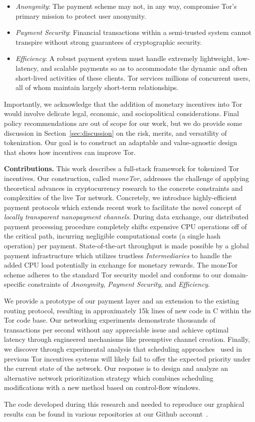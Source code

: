 \begin{itemize}
\item \emph{Anonymity}: The payment scheme may not, in any way, compromise Tor's primary mission to protect user anonymity.
\item \emph{Payment Security}: Financial transactions within a semi-trusted system cannot transpire without strong guarantees of cryptographic security.
\item \emph{Efficiency}: A robust payment system must handle extremely lightweight, low-latency, and scalable payments so as to accommodate the dynamic and often short-lived activities of these clients.
Tor services millions of concurrent users, all of whom maintain largely short-term relationships.
\end{itemize}

Importantly, we acknowledge that the addition of monetary incentives into Tor would involve delicate legal, economic, and sociopolitical considerations.
Final policy recommendations are out of scope for our work, but we do provide some discussion in Section~\ref{sec:discussion} on the risk, merits, and versatility of tokenization.
Our goal is to construct an adaptable and value-agnostic design that shows how incentives can improve Tor.

\label{sec:Contributions} \medskip \noindent \textbf{Contributions.}
This work describes a full-stack framework for tokenized Tor incentives.
Our construction, called \emph{moneTor}, addresses the challenge of applying theoretical advances in cryptocurrency research to the concrete constraints and complexities of the live Tor network.
Concretely, we introduce highly-efficient payment protocols which extends recent work to facilitate the novel concept of \emph{locally transparent nanopayment channels}.
During data exchange, our distributed payment processing procedure completely shifts expensive CPU operations off of the critical path, incurring negligible computational costs (a single hash operation) per payment.
State-of-the-art throughput is made possible by a global payment infrastructure which utilizes trustless \emph{Intermediaries} to handle the added CPU load potentially in exchange for monetary rewards.
The moneTor scheme adheres to the standard Tor security model and conforms to our domain-specific constraints of \emph{Anonymity}, \emph{Payment Security}, and \emph{Efficiency}.

We provide a prototype of our payment layer and an extension to the existing routing protocol, resulting in approximately 15k lines of new code in C within the Tor code base.
Our networking experiments demonstrate thousands of transactions per second without any appreciable issue and achieve optimal latency through engineered mechanisms like preemptive channel creation.
Finally, we discover through experimental analysis that scheduling approaches~\cite{dovrolis1999case, tang2010improved} used in previous Tor incentives systems will likely fail to offer the expected priority under the current state of the network.
Our response is to design and analyze an alternative network prioritization strategy which combines scheduling modifications with a new method based on control-flow windows.

The code developed during this research and needed to reproduce our graphical results can be found in various repositories at our Github account~\cite{monetor-github}.

